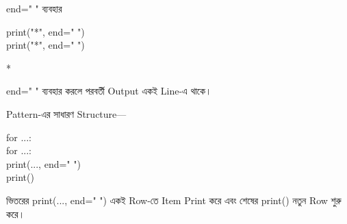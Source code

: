 \begin{codeoutputbox}{\textenglish{\ttfamily end=" "} ব্যবহার}

\noindent
\begin{minipage}[t]{0.53\linewidth}
\codeheading

\begin{english}
\ttfamily
print("*", end=" ")\\
print("*", end=" ")
\end{english}

\end{minipage}
\hfill
\begin{minipage}[t]{0.43\linewidth}
\outputheading

\textenglish{\ttfamily * *}

\medskip

\textenglish{\ttfamily end=" "}
ব্যবহার করলে পরবর্তী Output একই Line-এ থাকে।

\end{minipage}

\end{codeoutputbox}

\begin{rememberbox}

Pattern-এর সাধারণ Structure—

\begin{codebox}
\begin{english}
\ttfamily
for ...:\\
\hspace*{4mm}for ...:\\
\hspace*{8mm}print(..., end=" ")\\
\hspace*{4mm}print()
\end{english}
\end{codebox}

ভিতরের
\textenglish{\ttfamily print(..., end=" ")}
একই Row-তে Item Print করে এবং শেষের
\textenglish{\ttfamily print()}
নতুন Row শুরু করে।

\end{rememberbox}




